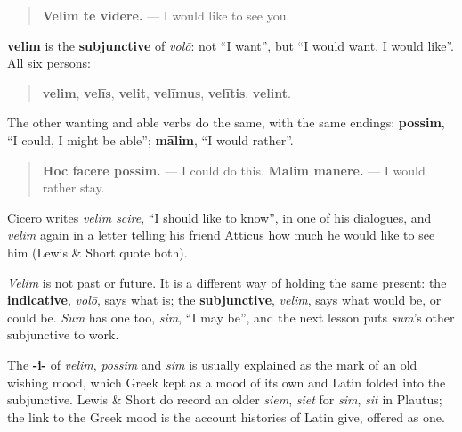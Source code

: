 \begin{grammarlens}[title={Grammar Lens: velim, the softer want}]
\begin{quote}
\textbf{Velim tē vidēre.} — I would like to see you.
\end{quote}

\textbf{velim} is the \textbf{subjunctive} of \emph{volō}: not \textquotedblleft{}I want\textquotedblright{}, but \textquotedblleft{}I would want, I would like\textquotedblright{}. All six persons:

\begin{quote}
\textbf{velim}, \textbf{velīs}, \textbf{velit}, \textbf{velīmus}, \textbf{velītis}, \textbf{velint}.
\end{quote}

The other wanting and able verbs do the same, with the same endings: \textbf{possim}, \textquotedblleft{}I could, I might be able\textquotedblright{}; \textbf{mālim}, \textquotedblleft{}I would rather\textquotedblright{}.

\begin{quote}
\textbf{Hoc facere possim.} — I could do this. \textbf{Mālim manēre.} — I would rather stay.
\end{quote}

Cicero writes \emph{velim scire}, \textquotedblleft{}I should like to know\textquotedblright{}, in one of his dialogues, and \emph{velim} again in a letter telling his friend Atticus how much he would like to see him (Lewis \& Short quote both).
\end{grammarlens}

\begin{culture}
\emph{Velim} is not past or future. It is a different way of holding the same present: the \textbf{indicative}, \emph{volō}, says what is; the \textbf{subjunctive}, \emph{velim}, says what would be, or could be. \emph{Sum} has one too, \emph{sim}, \textquotedblleft{}I may be\textquotedblright{}, and the next lesson puts \emph{sum}'s other subjunctive to work.
\end{culture}

\begin{cousinweb}
The \textbf{-i-} of \emph{velim}, \emph{possim} and \emph{sim} is usually explained as the mark of an old wishing mood, which Greek kept as a mood of its own and Latin folded into the subjunctive. Lewis \& Short do record an older \emph{siem}, \emph{siet} for \emph{sim}, \emph{sit} in Plautus; the link to the Greek mood is the account histories of Latin give, offered as one.
\end{cousinweb}

